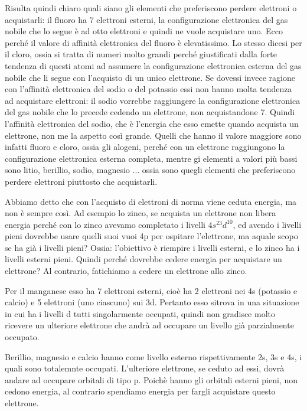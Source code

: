 Risulta quindi chiaro quali siano gli elementi che preferiscono perdere elettroni o acquistarli: il fluoro ha 7 elettroni esterni, la configurazione elettronica del gas nobile che lo segue è ad otto elettroni e quindi ne vuole acquistare uno. Ecco perché il valore di affinità elettronica del fluoro è elevatissimo. Lo stesso dicesi per il cloro, ossia si tratta di numeri molto grandi perché giustificati dalla forte tendenza di questi atomi ad assumere la configurazione elettronica esterna del gas nobile che li segue con l'acquisto di un unico elettrone. Se dovessi invece ragione con l'affinità elettronica del sodio o del potassio essi non hanno molta tendenza ad acquistare elettroni: il sodio vorrebbe raggiungere la configurazione elettronica del gas nobile che lo precede cedendo un elettrone, non acquistandone 7. Quindi l'affinità elettronica del sodio, che è l'energia che esso emette quando acquista un elettrone, non me la aspetto così grande. Quelli che hanno il valore maggiore sono infatti fluoro e cloro, ossia gli alogeni, perché con un elettrone raggiungono la configurazione elettronica esterna completa, mentre gi elementi a valori più bassi sono litio, berillio, sodio, magnesio ... ossia sono quegli elementi che preferiscono perdere elettroni piuttosto che acquistarli.

Abbiamo detto che con l'acquisto di elettroni di norma viene ceduta energia, ma non è sempre così. Ad esempio lo zinco, se acquista un elettrone non libera energia perché con lo zinco avevamo completato i livelli $4s^23d^{10}$, ed avendo i livelli pieni dovrebbe usare quelli suoi vuoi 4p per ospitare l'elettrone, ma aquale scopo se ha già i livelli pieni? Ossia: l'obiettivo è riempire i livelli esterni, e lo zinco ha i livelli esterni pieni. Quindi perché dovrebbe cedere energia per acquistare un elettrone? Al contrario, fatichiamo a cedere un elettrone allo zinco. 

Per il manganese esso ha 7 elettroni esterni, cioè ha 2 elettroni nei 4s (potassio e calcio) e 5 elettroni (uno ciascuno) sui 3d. Pertanto esso sitrova in una situazione in cui ha i livelli d tutti singolarmente occupati, quindi non gradisce molto ricevere un ulteriore elettrone che andrà ad occupare un livello già parzialmente occupato.

Berillio, magnesio e calcio hanno come livello esterno rispettivamente 2s, 3s e 4s, i quali sono totalemnte occupati. L'ulteriore elettrone, se ceduto ad essi, dovrà andare ad occupare orbitali di tipo p. Poichè hanno gli orbitali esterni pieni, non cedono energia, al contrario spendiamo energia per fargli acquistare questo elettrone.

